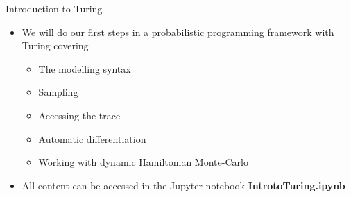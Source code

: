\documentclass[AERbeamer%
              ,optEnglish%
              ,optBiber%
              ,optBibstyleAlphabetic%
              ,optBeamerClassicFormat%
              ]{AERlatex}%
\begin{document}
\begin{frame}[c]{Introduction to Turing}
    \centering
    \begin{itemize}
        \item We will do our first steps in a probabilistic programming framework with Turing covering
        \begin{itemize}
            \item The modelling syntax
            \item Sampling
            \item Accessing the trace
            \item Automatic differentiation
            \item Working with dynamic Hamiltonian Monte-Carlo
        \end{itemize}
        \item All content can be accessed in the Jupyter notebook \textbf{IntrotoTuring.ipynb}
    \end{itemize}
\end{frame}










%
%
%
%
\end{document}
